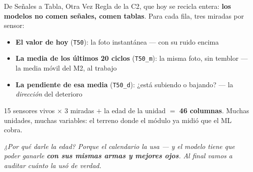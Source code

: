 \documentclass[aspectratio=169, 11pt]{beamer}
\begin{document}
\begin{frame}[shrink=16]{De Señales a Tabla, Otra Vez}
  \vspace{-2pt}
  {\footnotesize\color{textMuted}
  Regla de la C2, que hoy se recicla entera: \textbf{los modelos no comen
  señales, comen tablas}. Para cada fila, tres miradas por sensor:}
  \vspace{7pt}
  {\footnotesize
    \begin{itemize}\setlength{\itemsep}{8pt}
    \item[{\color{arcaRed}\faCamera}]
      \textbf{El valor de hoy} (\texttt{T50}): la foto instantánea ---
      con su ruido encima
    \item[{\color{arcaRed}\faFilter}]
      \textbf{La media de los últimos 20 ciclos} (\texttt{T50\_m}): la
      misma foto, sin temblor --- la media móvil del M2, al trabajo
    \item[{\color{arcaRed}\faChartLine}]
      \textbf{La pendiente de esa media} (\texttt{T50\_d}): ¿está
      subiendo o bajando? --- la \emph{dirección} del deterioro
    \end{itemize}}
  \vspace{7pt}
  \begin{tcolorbox}[colback=arcaGray, colframe=arcaDark, boxrule=0pt, leftrule=3pt,
    arc=3pt, left=8pt, right=8pt, top=5pt, bottom=5pt]
    {\footnotesize\color{arcaDark}
     15 sensores vivos $\times$ 3 miradas $+$ la edad de la unidad
     $=$ \textbf{46 columnas}. Muchas unidades, muchas variables: el
     terreno donde el módulo ya midió que el ML cobra.}
  \end{tcolorbox}
  \vspace{5pt}
  {\scriptsize\color{arcaDark}\itshape
   ¿Por qué darle la edad? Porque el calendario la usa --- y el modelo
   tiene que poder ganarle \textbf{con sus mismas armas y mejores ojos}.
   Al final vamos a auditar cuánto la usó de verdad.}
\end{frame}
\end{document}
